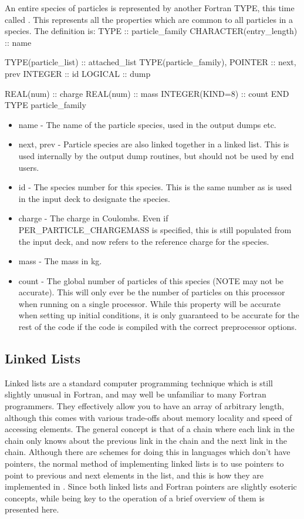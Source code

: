 \documentclass[12pt,a4paper]{article}
\newcommand{\inlinecode}[1]{{\color{warwickred} \bf\texttt{#1}}}
\newcommand{\EPOCH}{{\color{warwickdark}\fontfamily{phv}\selectfont{EPOCH}}}
\newenvironment{boxverbatim}{\lboxverbatim{none}}{\endlboxverbatim}
\begin{document}
An entire species of particles is represented by another Fortran TYPE, this
time called \linebreak\inlinecode{particle\_family}. This represents all the
properties which are common to all particles in a species. The definition is:
\begin{boxverbatim}
  TYPE :: particle_family
    CHARACTER(entry_length) :: name

    TYPE(particle_list) :: attached_list
    TYPE(particle_family), POINTER :: next, prev
    INTEGER :: id
    LOGICAL :: dump

    REAL(num) :: charge
    REAL(num) :: mass
    INTEGER(KIND=8) :: count
  END TYPE particle_family
\end{boxverbatim}

\begin{itemize}
\item name - The name of the particle species, used in the output dumps etc.
\item next, prev - Particle species are also linked together in a linked
  list. This is used internally by the output dump routines, but should not be
  used by end users.
\item id - The species number for this species. This is the same number as is
  used in the input deck to designate the species.
\item charge - The charge in Coulombs. Even if PER\_PARTICLE\_CHARGEMASS is
  specified, this is still populated from the input deck, and now refers to
  the reference charge for the species.
\item mass - The mass in kg.
\item count - The global number of particles of this species (NOTE may not
  be accurate). This will only ever be the number of particles on this
  processor when running on a single processor. While this property will be
  accurate when setting up initial conditions, it is only guaranteed to be
  accurate for the rest of the code if the code is compiled with the correct
  preprocessor options.
\end{itemize}

\subsection{Linked Lists}
Linked lists are a standard computer programming technique which is still
slightly unusual in Fortran, and may well be unfamiliar to many Fortran
programmers. They effectively allow you to have an array of arbitrary length,
although this comes with various trade-offs about memory locality and speed of
accessing elements. The general concept is that of a chain where each link in
the chain only knows about the previous link in the chain and the next link in
the chain. Although there are schemes for doing this in languages which don't
have pointers, the normal method of implementing linked lists is to use
pointers to point to previous and next elements in the list, and this is how
they are implemented in {\EPOCH}. Since both linked lists and Fortran pointers
are slightly esoteric concepts, while being key to the operation of {\EPOCH} a
brief overview of them is presented here.\\
\end{document}
